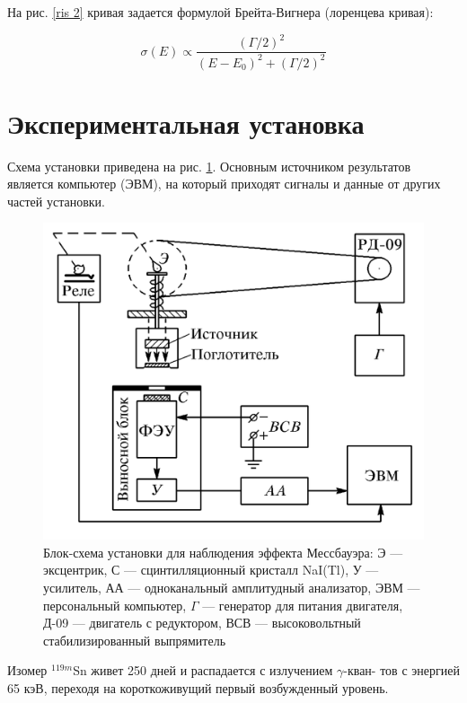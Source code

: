 \documentclass[12pt]{kiarticle}
\begin{document}
	На рис. \ref{ris 2} кривая задается формулой Брейта-Вигнера (лоренцева кривая):
	
	\begin{equation}\label{B-V}
	\sigma(E) \propto \dfrac{(\Gamma/2)^2}{(E - E_0)^2 + (\Gamma/2)^2}
	\end{equation}
	
	\section{Экспериментальная установка}
	
	Схема установки приведена на рис. \ref{lab}. Основным источником результатов является компьютер (ЭВМ), на который приходят сигналы и данные от других частей установки. 
	
	\begin{figure}[h!]
		\centering
		\includegraphics[width=0.7\linewidth]{lab}
		\caption{Блок-схема установки для наблюдения эффекта Мессбауэра: Э --- эксцентрик, С --- сцинтилляционный кристалл NaI(Tl), У --- усилитель, АА --- одноканальный амплитудный анализатор, ЭВМ --- персональный компьютер, $ \Gamma $ --- генератор для питания двигателя, Д-09 --- двигатель с редуктором, ВСВ --- высоковольтный стабилизированный выпрямитель}
		\label{lab}
	\end{figure}
	
	Изомер $^{119m}$Sn живет 250
	дней и распадается с излучением $ \gamma $-кван-
	тов с энергией 65 кэВ, переходя на короткоживущий первый возбужденный уровень.
	
\end{document}
